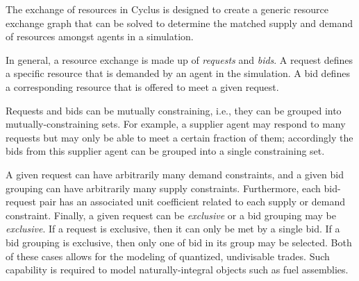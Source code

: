 The exchange of resources in Cyclus is designed to create a generic resource
exchange graph that can be solved to determine the matched supply and demand of
resources amongst agents in a simulation.

In general, a resource exchange is made up of \textit{requests} and
\textit{bids}. A request defines a specific resource that is demanded by an
agent in the simulation. A bid defines a corresponding resource that is offered
to meet a given request.

Requests and bids can be mutually constraining, i.e., they can be grouped into
mutually-constraining sets. For example, a supplier agent may respond to many
requests but may only be able to meet a certain fraction of them; accordingly
the bids from this supplier agent can be grouped into a single constraining set.

A given request can have arbitrarily many demand constraints, and a given bid
grouping can have arbitrarily many supply constraints. Furthermore, each
bid-request pair has an associated unit coefficient related to each supply or
demand constraint. Finally, a given request can be \textit{exclusive} or a bid
grouping may be \textit{exclusive}. If a request is exclusive, then it can only
be met by a single bid. If a bid grouping is exclusive, then only one of bid in
its group may be selected. Both of these cases allows for the modeling of
quantized, undivisable trades. Such capability is required to model
naturally-integral objects such as fuel assemblies.
